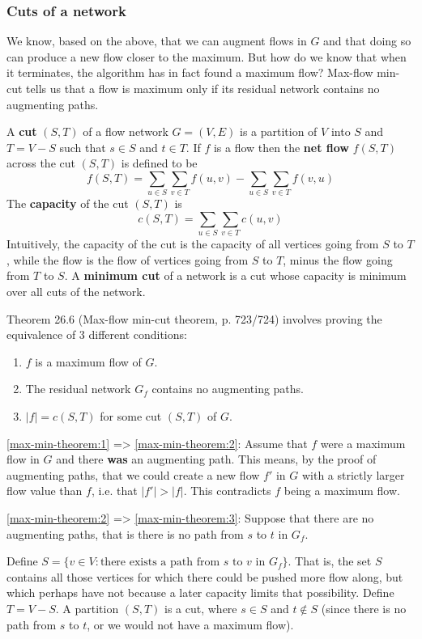 \subsubsection{Cuts of a network}
We know, based on the above, that we can augment flows in $G$ and that doing
so can produce a new flow closer to the maximum. But how do we know that when
it terminates, the algorithm has in fact found a maximum flow? Max-flow min-
cut tells us that a flow is maximum only if its residual network contains no
augmenting paths.

A \textbf{cut} $(S,T)$ of a flow network $G = (V,E)$ is a partition of $V$ into $S$ and $T=V-S$ such that
$s \in S$ and $t \in T$. If $f$ is a flow then the \textbf{net flow} $f(S,T)$ across the cut $(S,T)$ is
defined to be
%
\[
	f(S,T) = \sum_{u \in S} \sum_{v \in T} f(u,v) - 
	\sum_{u \in S} \sum_{v \in T} f(v,u)
\]
%
The \textbf{capacity} of the cut $(S,T)$ is
%
\[
	c(S,T) = \sum_{u \in S} \sum_{v \in T} c(u,v)
\]
%
Intuitively, the capacity of the cut is the capacity of all vertices going
from $S$ to $T$, while the flow is the flow of vertices going from $S$ to $T$,
minus the flow going from $T$ to $S$. A \textbf{minimum cut} of a network is a
cut whose capacity is minimum over all cuts of the network.

Theorem 26.6 (Max-flow min-cut theorem, p. 723/724) involves proving the equivalence of 3
different conditions:
\begin{enumerate}
	\item $f$ is a maximum flow of $G$. \label{max-min-theorem:1}
	\item The residual network $G_f$ contains no augmenting paths. \label{max-min-theorem:2}
	\item $|f| = c(S,T)$ for some cut $(S,T)$ of $G$. \label{max-min-theorem:3}
\end{enumerate}

\ref{max-min-theorem:1} => \ref{max-min-theorem:2}:
%
Assume that $f$ were a maximum flow in $G$ and there \textbf{was} an augmenting path. This
means, by the proof of augmenting paths, that we could create a new flow $f'$ in $G$ with a strictly
larger flow value than $f$, i.e. that $|f'| > |f|$. This contradicts $f$ being a maximum flow.

\ref{max-min-theorem:2} => \ref{max-min-theorem:3}:
%
Suppose that there are no augmenting paths, that is there is no path from $s$ to $t$ in $G_f$.

Define $S = \{v\in V: \text{there exists a path from $s$ to $v$ in $G_f$}\}$. That is, the set $S$
contains all those vertices for which there could be pushed more flow along, but which perhaps have
not because a later capacity limits that possibility. Define $T = V-S$. A partition $(S,T)$ is a cut,
where $s\in S$ and $t \notin S$ (since there is no path from $s$ to $t$, or we would not have a maximum
flow).

